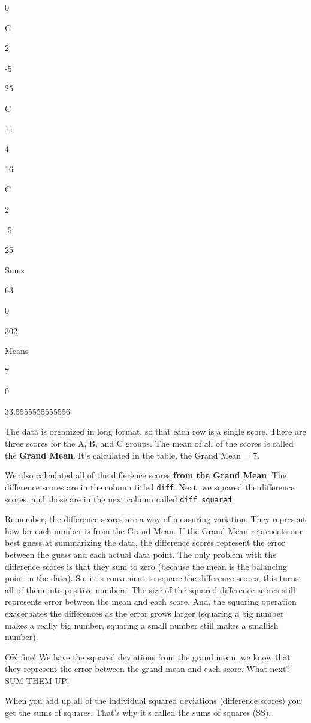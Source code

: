 \documentclass[
]{book}
\begin{document}
0

C

2

-5

25

C

11

4

16

C

2

-5

25

Sums

63

0

302

Means

7

0

33.5555555555556

The data is organized in long format, so that each row is a single score. There are three scores for the A, B, and C groups. The mean of all of the scores is called the \textbf{Grand Mean}. It's calculated in the table, the Grand Mean = 7.

We also calculated all of the difference scores \textbf{from the Grand Mean}. The difference scores are in the column titled \texttt{diff}. Next, we squared the difference scores, and those are in the next column called \texttt{diff\_squared}.

Remember, the difference scores are a way of measuring variation. They represent how far each number is from the Grand Mean. If the Grand Mean represents our best guess at summarizing the data, the difference scores represent the error between the guess and each actual data point. The only problem with the difference scores is that they sum to zero (because the mean is the balancing point in the data). So, it is convenient to square the difference scores, this turns all of them into positive numbers. The size of the squared difference scores still represents error between the mean and each score. And, the squaring operation exacerbates the differences as the error grows larger (squaring a big number makes a really big number, squaring a small number still makes a smallish number).

OK fine! We have the squared deviations from the grand mean, we know that they represent the error between the grand mean and each score. What next? SUM THEM UP!

When you add up all of the individual squared deviations (difference scores) you get the sums of squares. That's why it's called the sums of squares (SS).
\end{document}
